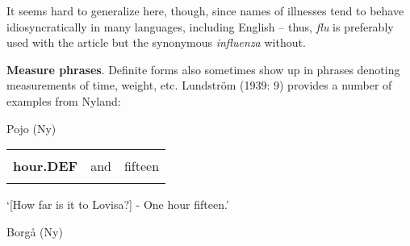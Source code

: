\begin{styleBodyTextFirst}
It seems hard to generalize here, though, since names of illnesses tend to behave idiosyncratically in many languages, including English – thus, \textit{flu} is preferably used with the article but the synonymous \textit{influenza} without.

\end{styleBodyTextFirst}

\begin{styleBodytextC}
\textbf{Measure phrases}. Definite forms also sometimes show up in phrases denoting measurements of time, weight, etc. Lundström (1939: 9) provides a number of examples from Nyland: 

\end{styleBodytextC}

\begin{listWWNumileveli}
\item {}

\end{listWWNumileveli}

\begin{listWWNumlileveli}
\item {}

\begin{styleExLtrTbl}
Pojo (Ny)

\end{styleExLtrTbl}

\end{listWWNumlileveli}

\begin{styleExampleC}

\end{styleExampleC}

\begin{tabular}{lll}
\lsptoprule
\multicolumn{3}{l}{{\bfseries Timmen}

}\\
{\bfseries hour.DEF} & and & fifteen\\
\lspbottomrule
\end{tabular}

\begin{styleTranslation}
‘[How far is it to Lovisa?] - One hour fifteen.’

\end{styleTranslation}

\begin{styleExLtrTblii}
Borgå (Ny)

\end{styleExLtrTblii}

